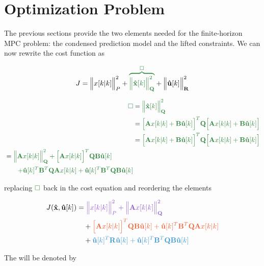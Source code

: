 
\section{Optimization Problem}

The previous sections provide the two elements needed for the finite-horizon MPC problem: the condensed prediction model and the lifted constraints. We can now rewrite the cost function as

\noindent
\begin{equation}
	J = \norma{x[k|k]}{P} + \green{\overbrace{\norma{\mathbf{\hat{x}}[k]}{\mathbf{Q}}}^{\square}} + \norma{\mathbf{\hat{u}}[k]}{\mathbf{R}}
\end{equation}

\noindent
\begin{align}
	\green{\square} 
	&= \green{\norma{\mathbf{\hat{x}}[k]}{\mathbf{Q}}} \\
	&= \green{\Big[ \mathbf{A}x[k|k] + \mathbf{B \hat{u}}[k] \Big]^T \mathbf{Q} \Big[ \mathbf{A}x[k|k] + \mathbf{B \hat{u}}[k] \Big]} \\
	&= \green{\Big[ \mathbf{A}x[k|k] + \mathbf{B \hat{u}}[k] \Big]^T \mathbf{Q} \Big[ \mathbf{A}x[k|k] + \mathbf{B \hat{u}}[k] \Big]} \\
	\begin{split}
		&= \green{\norma{\mathbf{A}x[k|k]}{\mathbf{Q}} + \Big[ \mathbf{A}x[k|k] \Big]^T \mathbf{Q} \mathbf{B \hat{u}}[k]} \\
		&\qquad \green{ + \mathbf{\hat{u}}[k]^T \mathbf{B}^T \mathbf{Q} \mathbf{A}x[k|k] + \mathbf{\hat{u}}[k]^T \mathbf{B}^T \mathbf{Q} \mathbf{B \hat{u}}[k]}
	\end{split}
\end{align}

\noindent
replacing $\green{\square}$ back in the cost equation and reordering the elements 

\noindent
\begin{align}
	J(\mathbf{\hat{x}}, \mathbf{\hat{u}}[k]) 
	&= \purple{ \norma{x[k|k]}{P} + \norma{\mathbf{A}x[k|k]}{\mathbf{Q}} } \\
	&\quad + \orange{\Big[\mathbf{A}x[k|k]\Big]^T \mathbf{Q} \mathbf{B} \mathbf{\hat{u}}[k]	+ \mathbf{\hat{u}}[k]^T \mathbf{B}^T \mathbf{Q} \mathbf{A} x[k|k]} \\
	&\quad + \blue{\mathbf{\hat{u}}[k]^T \mathbf{R} \mathbf{\hat{u}}[k] + \mathbf{\hat{u}}[k]^T \mathbf{B}^T \mathbf{Q} \mathbf{B} \mathbf{\hat{u}}[k]}
\end{align}

The  will be denoted by 

